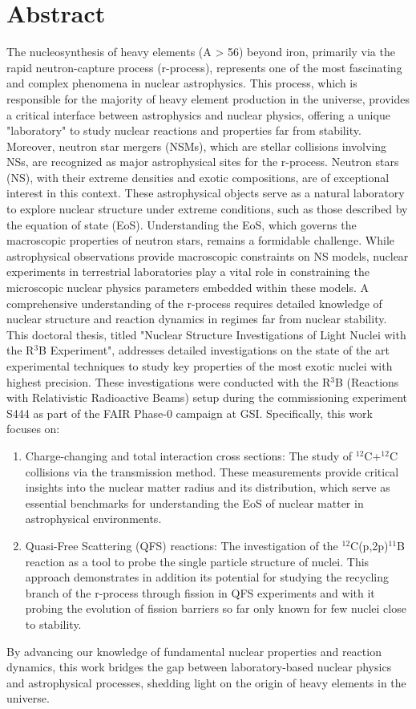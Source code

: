 \thispagestyle{empty}
\section*{Abstract}
The nucleosynthesis of heavy elements (A > 56) beyond iron, primarily via the rapid neutron-capture process (r-process), represents one of the most fascinating and complex phenomena in nuclear astrophysics. This process, which is responsible for the majority of heavy element production in the universe, provides a critical interface between astrophysics and nuclear physics, offering a unique "laboratory" to study nuclear reactions and properties far from stability. Moreover, neutron star mergers (NSMs), which are stellar collisions involving NSs, are recognized as major astrophysical sites for the r-process. Neutron stars (NS), with their extreme densities and exotic compositions, are of exceptional interest in this context. These astrophysical objects serve as a natural laboratory to explore nuclear structure under extreme conditions, such as those described by the equation of state (EoS). Understanding the EoS, which governs the macroscopic properties of neutron stars, remains a formidable challenge. While astrophysical observations provide macroscopic constraints on NS models, nuclear experiments in terrestrial laboratories play a vital role in constraining the microscopic nuclear physics parameters embedded within these models. A comprehensive understanding of the r-process requires detailed knowledge of nuclear structure and reaction dynamics in regimes far from nuclear stability.\newline
This doctoral thesis, titled "Nuclear Structure Investigations of Light Nuclei with the R$^3$B Experiment", addresses detailed investigations on the state of the art experimental techniques to study key properties of the most exotic nuclei with highest precision. These investigations were conducted with the R$^3$B (Reactions with Relativistic Radioactive Beams) setup during the commissioning experiment S444 as part of the FAIR Phase-0 campaign at GSI. Specifically, this work focuses on:
\begin{enumerate}
\item Charge-changing and total interaction cross sections: The study of $^{12}$C+$^{12}$C collisions via the transmission method. These measurements provide critical insights into the nuclear matter radius and its distribution, which serve as essential benchmarks for understanding the EoS of nuclear matter in astrophysical environments.
\item Quasi-Free Scattering (QFS) reactions: The investigation of the $^{12}$C(p,2p)$^{11}$B reaction as a tool to probe the single particle structure of nuclei. This approach demonstrates in addition its potential for studying the recycling branch of the r-process through fission in QFS experiments and with it probing the evolution of fission barriers so far only known for few nuclei close to stability. 
\end{enumerate}
By advancing our knowledge of fundamental nuclear properties and reaction dynamics, this work bridges the gap between laboratory-based nuclear physics and astrophysical processes, shedding light on the origin of heavy elements in the universe.
